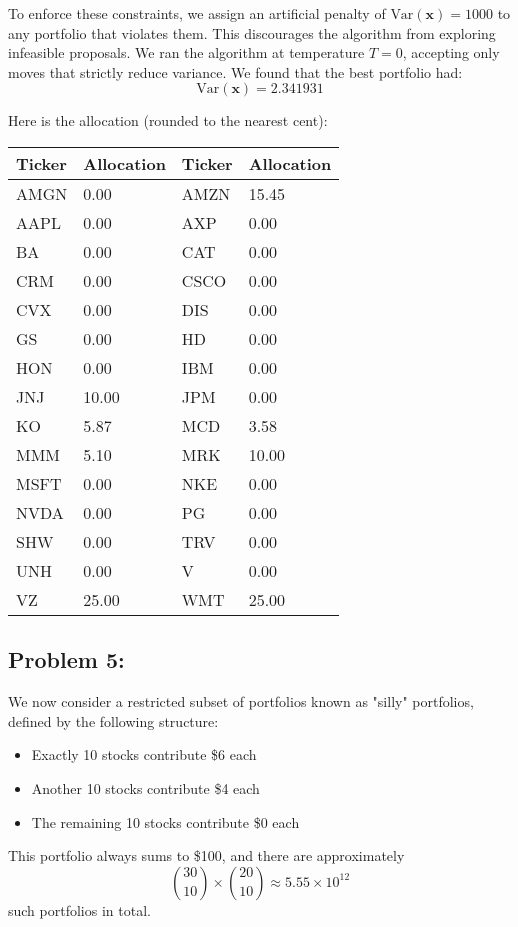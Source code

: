 \documentclass{report}
\begin{document}
To enforce these constraints, we assign an artificial penalty of $\text{Var}(\mathbf{x}) = 1000$ to any portfolio that violates them. This discourages the algorithm from exploring infeasible proposals. We ran the algorithm at temperature $T = 0$, accepting only moves that strictly reduce variance. We found that the best portfolio had:
\[
\text{Var}(\mathbf{x}) = 2.341931
\]

Here is the allocation (rounded to the nearest cent):

\begin{center}
\begin{tabular}{ll|ll}
\toprule
\textbf{Ticker} & \textbf{Allocation} & \textbf{Ticker} & \textbf{Allocation} \\
\midrule
AMGN & 0.00 & AMZN & 15.45 \\
AAPL & 0.00 & AXP  & 0.00 \\
BA   & 0.00 & CAT  & 0.00 \\
CRM  & 0.00 & CSCO & 0.00 \\
CVX  & 0.00 & DIS  & 0.00 \\
GS   & 0.00 & HD   & 0.00 \\
HON  & 0.00 & IBM  & 0.00 \\
JNJ  & 10.00 & JPM  & 0.00 \\
KO   & 5.87 & MCD  & 3.58 \\
MMM  & 5.10 & MRK  & 10.00 \\
MSFT & 0.00 & NKE  & 0.00 \\
NVDA & 0.00 & PG   & 0.00 \\
SHW  & 0.00 & TRV  & 0.00 \\
UNH  & 0.00 & V    & 0.00 \\
VZ   & 25.00 & WMT  & 25.00 \\
\bottomrule
\end{tabular}
\end{center}




\pagebreak


\subsection*{Problem 5:}
We now consider a restricted subset of portfolios known as "silly" portfolios, defined by the following structure:
\begin{itemize}
    \item Exactly 10 stocks contribute \$6 each
    \item Another 10 stocks contribute \$4 each
    \item The remaining 10 stocks contribute \$0 each
\end{itemize}
This portfolio always sums to \$100, and there are approximately 
\[
\binom{30}{10} \times \binom{20}{10} \approx 5.55 \times 10^{12}
\]
such portfolios in total. \\
\end{document}
